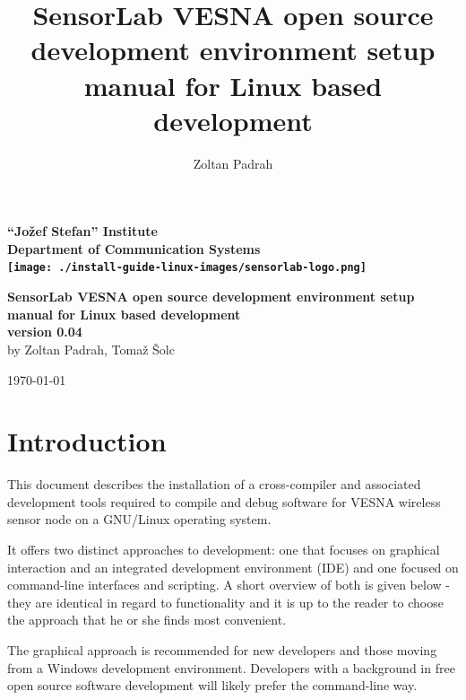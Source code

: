 \documentclass[a4paper, 10pt]{article}
\title{SensorLab VESNA open source development environment setup manual for Linux based development}
\author{Zoltan Padrah}
\begin{document}
\begin{titlepage}
    \begin{center}
    \textbf{
        \Large ``Jožef Stefan'' Institute \\[2mm]
        Department of Communication Systems\\[2mm]
        \texttt{[image: ./install-guide-linux-images/sensorlab-logo.png]}
        }\\

    \vfill

    \textbf{\huge SensorLab VESNA open source development environment setup manual
        for Linux based development}\\[1.5cm]


    \textbf{ \Large
    version 0.04}\\[1cm]
    
    \textnormal{\Large
    by Zoltan Padrah, Tomaž Šolc}\\[1cm]
    
    \vfill

    \textnormal{\large
    \today\\[1cm]
    }
    \end{center}
\end{titlepage}


\section{Introduction}

This document describes the installation of a cross-compiler and associated
development tools required to compile and debug software for VESNA wireless
sensor node on a GNU/Linux operating system.

It offers two distinct approaches to development: one that focuses on graphical
interaction and an integrated development environment (IDE) and one focused on
command-line interfaces and scripting. A short overview of both is given below
- they are identical in regard to functionality and it is up to the reader to
choose the approach that he or she finds most convenient.

The graphical approach is recommended for new developers and those moving from a
Windows development environment. Developers with a background in free open
source software development will likely prefer the command-line way.
\end{document}
